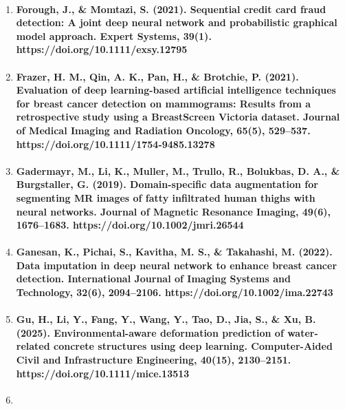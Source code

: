 \begin{enumerate}
  \paragraph{Feng, Y., Zhou, M., \& Tong, X. (2021). Imbalanced classification: A paradigm-based review. Statistical Analysis and Data Mining: The ASA Data Science Journal, 14(5), 383–406. https://doi.org/10.1002/sam.11538}
\item
  \paragraph{Forough, J., \& Momtazi, S. (2021). Sequential credit card fraud detection: A joint deep neural network and probabilistic graphical model approach. Expert Systems, 39(1). https://doi.org/10.1111/exsy.12795}
\item
  \paragraph{Frazer, H. M., Qin, A. K., Pan, H., \& Brotchie, P. (2021). Evaluation of deep learning-based artificial intelligence techniques for breast cancer detection on mammograms: Results from a retrospective study using a BreastScreen Victoria dataset. Journal of Medical Imaging and Radiation Oncology, 65(5), 529–537. https://doi.org/10.1111/1754-9485.13278}
\item
  \paragraph{Gadermayr, M., Li, K., Muller, M., Trullo, R., Bolukbas, D. A., \& Burgstaller, G. (2019). Domain-specific data augmentation for segmenting MR images of fatty infiltrated human thighs with neural networks. Journal of Magnetic Resonance Imaging, 49(6), 1676–1683. https://doi.org/10.1002/jmri.26544}
\item
  \paragraph{Ganesan, K., Pichai, S., Kavitha, M. S., \& Takahashi, M. (2022). Data imputation in deep neural network to enhance breast cancer detection. International Journal of Imaging Systems and Technology, 32(6), 2094–2106. https://doi.org/10.1002/ima.22743}
\item
  \paragraph{Gu, H., Li, Y., Fang, Y., Wang, Y., Tao, D., Jia, S., \& Xu, B. (2025). Environmental-aware deformation prediction of water-related concrete structures using deep learning. Computer-Aided Civil and Infrastructure Engineering, 40(15), 2130–2151. https://doi.org/10.1111/mice.13513}
\item

\end{enumerate}
